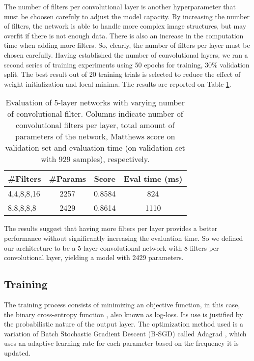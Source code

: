         The number of filters per convolutional layer is another hyperparameter that must be choosen carefuly to adjust the model capacity. By increasing the number of filters, the network is able to handle more complex image structures, but may overfit if there is not enough data. There is also an increase in the computation time when adding more filters. So, clearly, the number of filters per layer must be chosen carefully. Having established the number of convolutional layers, we ran a second series of training experiments using 50 epochs for training, 30\% validation split. The best result out of 20 training trials is selected to reduce the effect of weight initialization and local minima. The results are reported on Table \ref{table:evalNumberFilters}.

        \begin{table}
      	 \begin{center}
      	  \caption{Evaluation of 5-layer networks with varying number of convolutional filter. Columns indicate number of convolutional filters per layer, total amount of parameters of the network, Matthews score on validation set and evaluation time (on validation set with 929 samples), respectively.}
      	  \label{table:evalNumberFilters}
      	  \begin{tabular}{ | l | c | c | c |}
      	    \hline
      	    \#Filters  & \#Params  &  Score   & Eval time (ms)   \\ \hline
      	    4,4,8,8,16 &   2257    &  0.8584  &    824           \\
      	    8,8,8,8,8  &   2429    &  0.8614  &    1110           \\ \hline
      		  \end{tabular}
      		\end{center}
      	 \end{table}

        The results suggest that having more filters per layer provides a better performance without significantly increasing the evaluation time. So we defined our architecture to be a 5-layer convolutional network with 8 filters per convolutional layer, yielding a model with 2429 parameters.


    \subsection{Training}
    \label{subsec:training}
        The training process consists of minimizing an objective function, in this case, the binary cross-entropy function \cite{DLbook}, also known as log-loss. Its use is justified by the probabilistic nature of the output layer. The optimization method used is a variation of Batch Stochastic Gradient Descent (B-SGD) called Adagrad \cite{duchi2011adaptive}, which uses an adaptive learning rate for each parameter based on the frequency it is updated.

